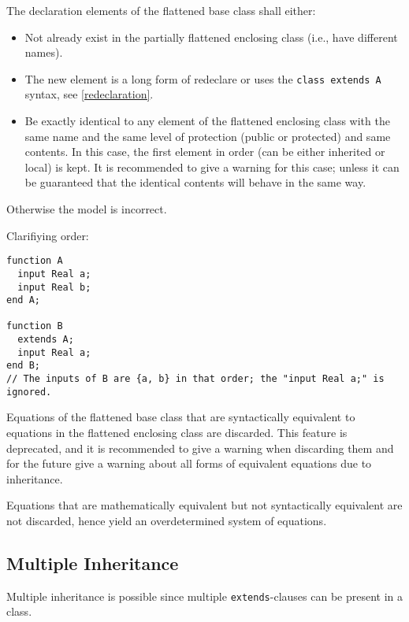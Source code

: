 The declaration elements of the flattened base class shall either:
\begin{itemize}
\item
  Not already exist in the partially flattened enclosing class
  (i.e., have different names).
\item
  The new element is a long form of redeclare or uses the \lstinline!class extends A! syntax, see \cref{redeclaration}.
\item
  Be exactly identical to any element of the flattened enclosing class
  with the same name and the same level of protection (public or
  protected) and same contents. In this case, the first element in order
  (can be either inherited or local) is kept. It is recommended to give
  a warning for this case; unless it can be guaranteed that the
  identical contents will behave in the same way.
\end{itemize}

Otherwise the model is incorrect.

\begin{nonnormative}
Clarifiying order:
\begin{lstlisting}[language=modelica]
function A
  input Real a;
  input Real b;
end A;

function B
  extends A;
  input Real a;
end B;
// The inputs of B are {a, b} in that order; the "input Real a;" is ignored.
\end{lstlisting}
\end{nonnormative}

Equations of the flattened base class that are syntactically equivalent
to equations in the flattened enclosing class are discarded. This
feature is deprecated, and it is recommended to give a warning when
discarding them and for the future give a warning about all forms of
equivalent equations due to inheritance.

\begin{nonnormative}
Equations that are mathematically equivalent but not syntactically equivalent are not discarded, hence yield an overdetermined system of equations.
\end{nonnormative}

\subsection{Multiple Inheritance}\label{multiple-inheritance}

Multiple inheritance is possible since multiple \lstinline!extends!-clauses can be present in a class.

